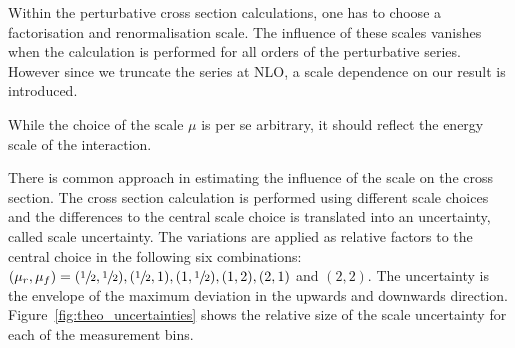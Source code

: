 Within the perturbative cross section calculations, one has to choose a
factorisation and renormalisation scale. The influence of these scales vanishes
when the calculation is performed for all orders of the perturbative series.
However since we truncate the series at NLO, a scale dependence on our result is
introduced. 

While the choice of the scale $\mu$ is per se arbitrary, it should reflect the
energy scale of the interaction. 

There is common approach in estimating the influence of the scale on the cross
section. The cross section calculation is performed using different scale
choices and the differences to the central scale choice is translated into an
uncertainty, called scale uncertainty. The variations are applied as relative
factors to the central choice in the following six combinations: $(\mu_r, \mu_f) =
(\sfrac{1}{2}, \sfrac{1}{2}), (\sfrac{1}{2}, 1), (1, \sfrac{1}{2}), (1, 2), (2,
1)$ and $(2, 2)$. The uncertainty is the envelope of the maximum deviation in
the upwards and downwards direction.  Figure~\ref{fig:theo_uncertainties} shows
the relative size of the scale uncertainty for each of the measurement bins.

